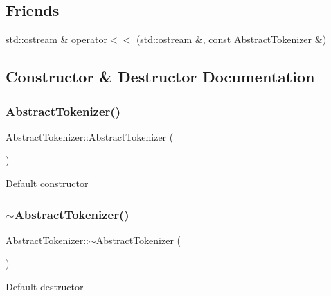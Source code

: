 \subsection*{Friends}
\begin{DoxyCompactItemize}
\item 
std\+::ostream \& \hyperlink{classAbstractTokenizer_afe537fa967b2a1d1db799e201b4007fa}{operator$<$$<$} (std\+::ostream \&, const \hyperlink{classAbstractTokenizer}{Abstract\+Tokenizer} \&)
\end{DoxyCompactItemize}


\subsection{Constructor \& Destructor Documentation}
\mbox{\label{classAbstractTokenizer_ad5dd529f11552a1bb522f97077148270}} 
\subsubsection{\texorpdfstring{Abstract\+Tokenizer()}{AbstractTokenizer()}}
{\footnotesize\ttfamily Abstract\+Tokenizer\+::\+Abstract\+Tokenizer (\begin{DoxyParamCaption}{ }\end{DoxyParamCaption})}

Default constructor \mbox{\label{classAbstractTokenizer_ac9005dbf8971809768ddfeea2db3e3a9}} 
\subsubsection{\texorpdfstring{$\sim$\+Abstract\+Tokenizer()}{~AbstractTokenizer()}}
{\footnotesize\ttfamily Abstract\+Tokenizer\+::$\sim$\+Abstract\+Tokenizer (\begin{DoxyParamCaption}{ }\end{DoxyParamCaption})\hspace{0.3cm}{\ttfamily [virtual]}}

Default destructor 

